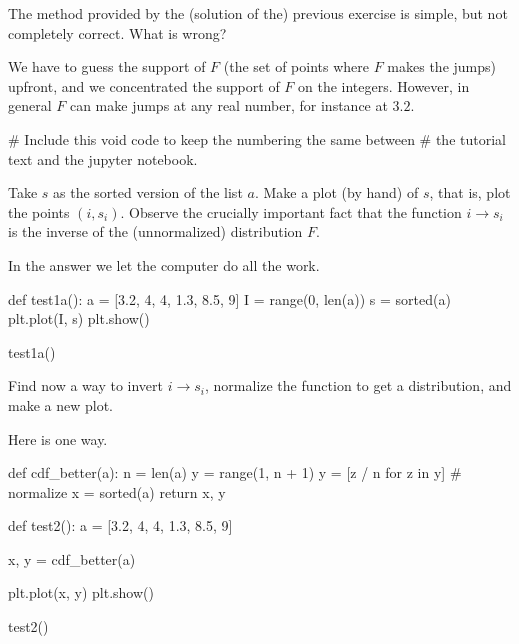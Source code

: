 \begin{exercise}\label{ex:2}
  The method provided by the (solution of the) previous exercise is simple, but not completely correct. What is wrong?
\begin{solution}
  We have to guess the support of $F$ (the set of points where $F$ makes the jumps) upfront, and we concentrated the support of $F$ on the integers.
  However, in general $F$ can make jumps at any real number, for instance at $3.2$.

  \begin{pyverbatim}
    # Include this void code to keep the numbering the same between
    # the tutorial text and the jupyter notebook.
\end{pyverbatim}

\end{solution}
\end{exercise}

\begin{exercise}
  Take $s$ as the sorted version of the list $a$.
  Make a plot (by hand) of $s$, that is, plot the points $(i, s_i)$.
  Observe the crucially important fact that the function $i\to s_i$ is the inverse of the (unnormalized) distribution $F$.
\begin{solution}
    In the answer we let the computer do all the work.

\begin{pyverbatim}
def test1a():
    a = [3.2, 4, 4, 1.3, 8.5, 9]
    I = range(0, len(a))
    s = sorted(a)
    plt.plot(I, s)
    plt.show()


test1a()
\end{pyverbatim}
  \end{solution}
\end{exercise}

\begin{exercise}
  Find now a way to invert $i\to s_i$, normalize the function to get a distribution, and make a new plot.
\begin{solution}
Here is one way.
\begin{pyverbatim}
def cdf_better(a):
    n = len(a)
    y = range(1, n + 1)
    y = [z / n for z in y]  # normalize
    x = sorted(a)
    return x, y


def test2():
    a = [3.2, 4, 4, 1.3, 8.5, 9]

    x, y = cdf_better(a)

    plt.plot(x, y)
    plt.show()


test2()
\end{pyverbatim}


  \end{solution}
\end{exercise}

